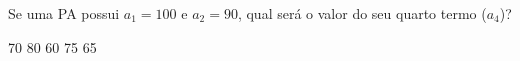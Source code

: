 Se uma PA possui $a_1 = 100$ e $a_2 = 90$, qual será o valor do seu quarto termo ($a_4$)?

70
80
60
75
65





